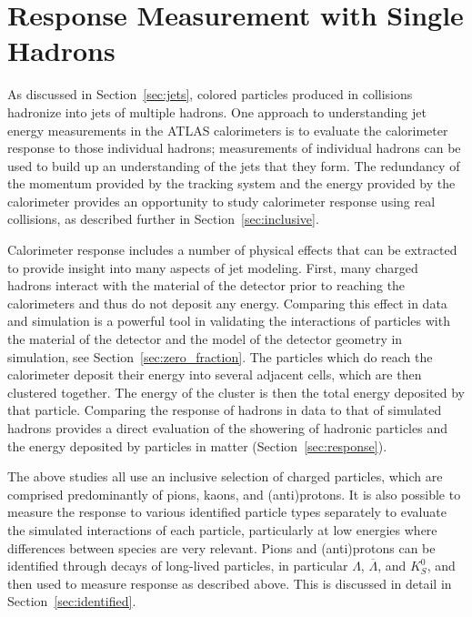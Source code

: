 \chapter{Response Measurement with Single Hadrons}

\label{ch:singlehadrons}

As discussed in Section~\ref{sec:jets}, colored particles produced in collisions hadronize into jets of multiple hadrons.
One approach to understanding jet energy measurements in the ATLAS calorimeters is to evaluate the calorimeter response to those individual hadrons; measurements of individual hadrons can be used to build up an understanding of the jets that they form.
The redundancy of the momentum provided by the tracking system and the energy provided by the calorimeter provides an opportunity to study calorimeter response using real collisions, as described further in Section~\ref{sec:inclusive}.

Calorimeter response includes a number of physical effects that can be extracted to provide insight into many aspects of jet modeling.
First, many charged hadrons interact with the material of the detector prior to reaching the calorimeters and thus do not deposit any energy.
Comparing this effect in data and simulation is a powerful tool in validating the interactions of particles with the material of the detector and the model of the detector geometry in simulation, see Section~\ref{sec:zero_fraction}.
The particles which do reach the calorimeter deposit their energy into several adjacent cells, which are then clustered together.
The energy of the cluster is then the total energy deposited by that particle.
Comparing the response of hadrons in data to that of simulated hadrons provides a direct evaluation of the showering of hadronic particles and the energy deposited by particles in matter (Section~\ref{sec:response}). 

The above studies all use an inclusive selection of charged particles, which are comprised predominantly of pions, kaons, and (anti)protons.
It is also possible to measure the response to various identified particle types separately to evaluate the simulated interactions of each particle, particularly at low energies where differences between species are very relevant.
Pions and (anti)protons can be identified through decays of long-lived particles, in particular $\Lambda$, $\overline{\Lambda}$, and $K_{S}^{0}$, and then used to measure response as described above.
This is discussed in detail in Section~\ref{sec:identified}.

